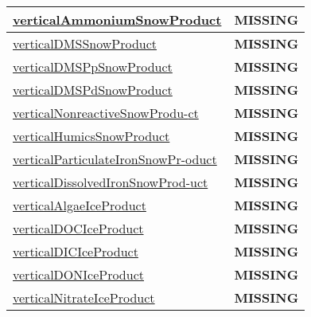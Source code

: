 {\begin{center}
\begin{longtable}{| p{2.0in} | p{4.0in} |}
    \hline
    \hyperref[subsec:var_sec_tracer_products_verticalAmmoniumSnowProduct]{verticalAmmoniumSnowProduct} & {\bf \color{red} MISSING} \\
    \hline
    \hyperref[subsec:var_sec_tracer_products_verticalDMSSnowProduct]{verticalDMSSnowProduct} & {\bf \color{red} MISSING} \\
    \hline
    \hyperref[subsec:var_sec_tracer_products_verticalDMSPpSnowProduct]{verticalDMSPpSnowProduct} & {\bf \color{red} MISSING} \\
    \hline
    \hyperref[subsec:var_sec_tracer_products_verticalDMSPdSnowProduct]{verticalDMSPdSnowProduct} & {\bf \color{red} MISSING} \\
    \hline
    \hyperref[subsec:var_sec_tracer_products_verticalNonreactiveSnowProduct]{verticalNonreactiveSnowProdu-}\hyperref[subsec:var_sec_tracer_products_verticalNonreactiveSnowProduct]{ct  }& {\bf \color{red} MISSING} \\
    \hline
    \hyperref[subsec:var_sec_tracer_products_verticalHumicsSnowProduct]{verticalHumicsSnowProduct} & {\bf \color{red} MISSING} \\
    \hline
    \hyperref[subsec:var_sec_tracer_products_verticalParticulateIronSnowProduct]{verticalParticulateIronSnowPr-}\hyperref[subsec:var_sec_tracer_products_verticalParticulateIronSnowProduct]{oduct  }& {\bf \color{red} MISSING} \\
    \hline
    \hyperref[subsec:var_sec_tracer_products_verticalDissolvedIronSnowProduct]{verticalDissolvedIronSnowProd-}\hyperref[subsec:var_sec_tracer_products_verticalDissolvedIronSnowProduct]{uct  }& {\bf \color{red} MISSING} \\
    \hline
    \hyperref[subsec:var_sec_tracer_products_verticalAlgaeIceProduct]{verticalAlgaeIceProduct} & {\bf \color{red} MISSING} \\
    \hline
    \hyperref[subsec:var_sec_tracer_products_verticalDOCIceProduct]{verticalDOCIceProduct} & {\bf \color{red} MISSING} \\
    \hline
    \hyperref[subsec:var_sec_tracer_products_verticalDICIceProduct]{verticalDICIceProduct} & {\bf \color{red} MISSING} \\
    \hline
    \hyperref[subsec:var_sec_tracer_products_verticalDONIceProduct]{verticalDONIceProduct} & {\bf \color{red} MISSING} \\
    \hline
    \hyperref[subsec:var_sec_tracer_products_verticalNitrateIceProduct]{verticalNitrateIceProduct} & {\bf \color{red} MISSING} \\
    \hline

\end{longtable}
\end{center}}
